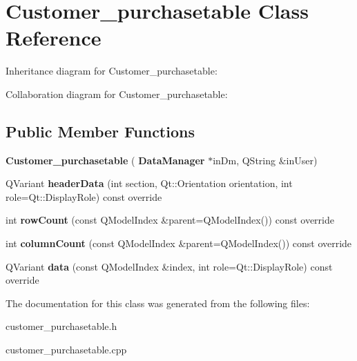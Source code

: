 \section{Customer\+\_\+purchasetable Class Reference}
\label{class_customer__purchasetable}


Inheritance diagram for Customer\+\_\+purchasetable\+:


Collaboration diagram for Customer\+\_\+purchasetable\+:
\subsection*{Public Member Functions}
\begin{DoxyCompactItemize}
\item 
\mbox{\label{class_customer__purchasetable_ad486ceaadffedf01327068fa04073b50}} 
{\bfseries Customer\+\_\+purchasetable} (\textbf{ Data\+Manager} $\ast$in\+Dm, Q\+String \&in\+User)
\item 
\mbox{\label{class_customer__purchasetable_ac4ea7bf4b6a4306022734c6d1f0ff6df}} 
Q\+Variant {\bfseries header\+Data} (int section, Qt\+::\+Orientation orientation, int role=Qt\+::\+Display\+Role) const override
\item 
\mbox{\label{class_customer__purchasetable_a0010c79adfe4b824bb186cbfaad7f967}} 
int {\bfseries row\+Count} (const Q\+Model\+Index \&parent=Q\+Model\+Index()) const override
\item 
\mbox{\label{class_customer__purchasetable_a53e83346f08b92f9b939439107d6d9b9}} 
int {\bfseries column\+Count} (const Q\+Model\+Index \&parent=Q\+Model\+Index()) const override
\item 
\mbox{\label{class_customer__purchasetable_ac809922e79fece6a6e40d6690fcb4fe8}} 
Q\+Variant {\bfseries data} (const Q\+Model\+Index \&index, int role=Qt\+::\+Display\+Role) const override
\end{DoxyCompactItemize}


The documentation for this class was generated from the following files\+:\begin{DoxyCompactItemize}
\item 
customer\+\_\+purchasetable.\+h\item 
customer\+\_\+purchasetable.\+cpp\end{DoxyCompactItemize}
